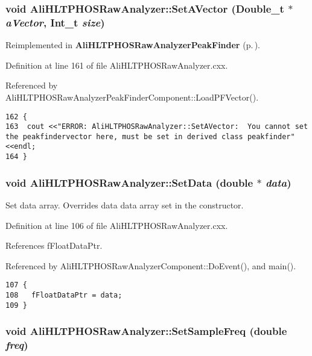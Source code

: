 \subsubsection{\setlength{\rightskip}{0pt plus 5cm}void Ali\-HLTPHOSRaw\-Analyzer::Set\-AVector (Double\_\-t $\ast$ {\em a\-Vector}, Int\_\-t {\em size})\hspace{0.3cm}{\tt  [virtual]}}\label{classAliHLTPHOSRawAnalyzer_a16}




Reimplemented in {\bf Ali\-HLTPHOSRaw\-Analyzer\-Peak\-Finder} {\rm (p.\,\pageref{classAliHLTPHOSRawAnalyzerPeakFinder_a5})}.

Definition at line 161 of file Ali\-HLTPHOSRaw\-Analyzer.cxx.

Referenced by Ali\-HLTPHOSRaw\-Analyzer\-Peak\-Finder\-Component::Load\-PFVector().

\footnotesize\begin{verbatim}162 {
163  cout <<"ERROR: AliHLTPHOSRawAnalyzer::SetAVector:  You cannot set the peakfindervector here, must be set in derived class peakfinder"<<endl;
164 }
\end{verbatim}\normalsize 


\subsubsection{\setlength{\rightskip}{0pt plus 5cm}void Ali\-HLTPHOSRaw\-Analyzer::Set\-Data (double $\ast$ {\em data})}\label{classAliHLTPHOSRawAnalyzer_a10}


Set data array. Overrides data data array set in the constructor. 

Definition at line 106 of file Ali\-HLTPHOSRaw\-Analyzer.cxx.

References f\-Float\-Data\-Ptr.

Referenced by Ali\-HLTPHOSRaw\-Analyzer\-Component::Do\-Event(), and main().

\footnotesize\begin{verbatim}107 {
108   fFloatDataPtr = data;
109 }
\end{verbatim}\normalsize 


\subsubsection{\setlength{\rightskip}{0pt plus 5cm}void Ali\-HLTPHOSRaw\-Analyzer::Set\-Sample\-Freq (double {\em freq})}\label{classAliHLTPHOSRawAnalyzer_a11}





